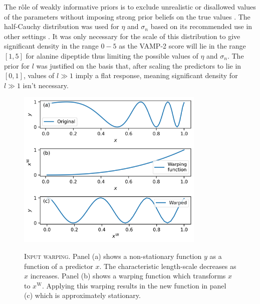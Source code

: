 The r\^ole of weakly informative priors is to exclude unrealistic or disallowed values of the parameters without imposing strong prior beliefs on the true values \cite{gelmanBayesianDataAnalysis2014}. The half-Cauchy distribution  was used for $\eta$ and $\sigma_n$  based on its recommended use in other settings \cite{polsonHalfCauchyPriorGlobal2012}. It was only necessary for the scale of this distribution to give significant density in the range $0-5$ as the VAMP-2 score will lie in the range $[1,5]$ for alanine dipeptide thus limiting the possible values of $\eta$ and $\sigma_{n}$. The prior for $l$ was justified on the basis that, after scaling the predictors to lie in $[0, 1]$, values of $l \gg 1$ imply a flat response, meaning significant density for $l \gg 1$ isn't necessary. 

\begin{figure}
    \centering
    \caption[Input warping]{\textsc{Input warping}. Panel (a) shows a non-stationary function $y$ as a function of a predictor $x$. The characteristic length-scale decreases as $x$ increases. Panel (b) shows a warping function which transforms $x$ to $x^\mathrm{W}$. Applying this warping results in the new function in panel (c) which is approximately stationary.}
    \includegraphics[width=0.8\textwidth]{chapters/msm_optimization/figures/warping_explainer.png}
    \label{fig:msm_warping_explainer}
\end{figure}

